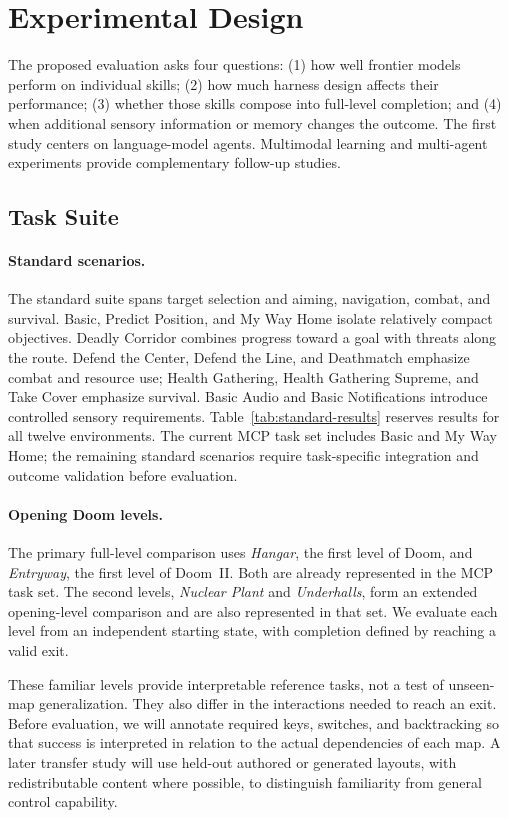 \section{Experimental Design}
\label{sec:experiments}
The proposed evaluation asks four questions: (1) how well frontier models perform on individual \vzd{} skills; (2) how much harness design affects their performance; (3) whether those skills compose into full-level completion; and (4) when additional sensory information or memory changes the outcome. The first study centers on language-model agents. Multimodal learning and multi-agent experiments provide complementary follow-up studies.

\subsection{Task Suite}
\paragraph{Standard scenarios.}
The standard suite spans target selection and aiming, navigation, combat, and survival. Basic, Predict Position, and My Way Home isolate relatively compact objectives. Deadly Corridor combines progress toward a goal with threats along the route. Defend the Center, Defend the Line, and Deathmatch emphasize combat and resource use; Health Gathering, Health Gathering Supreme, and Take Cover emphasize survival. Basic Audio and Basic Notifications introduce controlled sensory requirements. Table~\ref{tab:standard-results} reserves results for all twelve environments. The current MCP task set includes Basic and My Way Home; the remaining standard scenarios require task-specific integration and outcome validation before evaluation.

\paragraph{Opening Doom levels.}
The primary full-level comparison uses \emph{Hangar}, the first level of Doom, and \emph{Entryway}, the first level of Doom~II. Both are already represented in the MCP task set. The second levels, \emph{Nuclear Plant} and \emph{Underhalls}, form an extended opening-level comparison and are also represented in that set. We evaluate each level from an independent starting state, with completion defined by reaching a valid exit.

These familiar levels provide interpretable reference tasks, not a test of unseen-map generalization. They also differ in the interactions needed to reach an exit. Before evaluation, we will annotate required keys, switches, and backtracking so that success is interpreted in relation to the actual dependencies of each map. A later transfer study will use held-out authored or generated layouts, with redistributable content where possible, to distinguish familiarity from general control capability.

